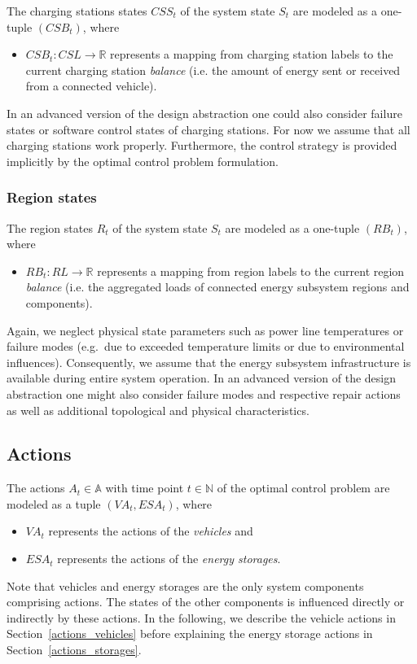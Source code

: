 The charging stations states $CSS_t$ of the system state $S_t$ are modeled as a one-tuple $(CSB_t)$, where
\begin{itemize}
	\item $CSB_t: CSL \rightarrow \mathbb{R}$ represents a mapping from charging station labels to the current charging station \textit{balance} (i.e. the amount of energy sent or received from a connected vehicle).
\end{itemize}
In an advanced version of the design abstraction one could also consider failure states or software control states of charging stations. For now we assume that all charging stations work properly. Furthermore, the control strategy is provided implicitly by the optimal control problem formulation.

\subsubsection{Region states}
\label{states_regions}

The region states $R_t$ of the system state $S_t$ are modeled as a one-tuple $(RB_t)$, where
\begin{itemize}
	\item $RB_t: RL \rightarrow \mathbb{R}$ represents a mapping from region labels to the current region \textit{balance} (i.e. the aggregated loads of connected energy subsystem regions and components).
\end{itemize}
Again, we neglect physical state parameters such as power line temperatures or failure modes (e.g.\ due to exceeded temperature limits or due to environmental influences). Consequently, we assume that the energy subsystem infrastructure is available during entire system operation. In an advanced version of the design abstraction one might also consider failure modes and respective repair actions ~\cite{?} as well as additional topological and physical characteristics.

\subsection{Actions}
\label{actions}

The actions $A_t \in \mathbb{A}$ with time point $t \in \mathbb{N}$ of the optimal control problem are modeled as a tuple $(VA_t, ESA_t)$, where
\begin{itemize}
	\item $VA_t$ represents the actions of the \textit{vehicles} and
	\item $ESA_t$ represents the actions of the \textit{energy storages}.
\end{itemize}
Note that vehicles and energy storages are the only system components comprising actions. The states of the other components is influenced directly or indirectly by these actions. In the following, we describe the vehicle actions in Section~\ref{actions_vehicles} before explaining the energy storage actions in Section~\ref{actions_storages}.

